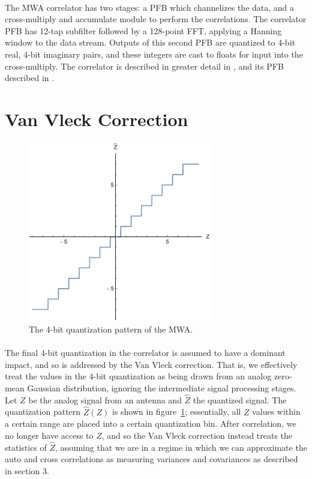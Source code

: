 \documentclass[11pt]{article}
\begin{document}
\paragraph{}
The MWA correlator has two stages: a PFB which channelizes the data, and a cross-multiply and accumulate module to perform the correlations. The correlator PFB  has 12-tap subfilter followed by a 128-point FFT, applying a Hanning window to the data stream. Outputs of this second PFB are quantized to 4-bit real, 4-bit imaginary pairs, and these integers are cast to floats for input into the cross-multiply. The correlator is described in greater detail in \cite{corr}, and its PFB described in \cite{pfb}.
\section{Van Vleck Correction}
\begin{figure}
\centering{}
\includegraphics[width=80mm]{quant.pdf}
\caption{The 4-bit quantization pattern of the MWA.\label{quant}}
\end{figure}
\paragraph{}
The final 4-bit quantization in the correlator is assumed to have a dominant impact, and so is addressed by the Van Vleck correction.
That is, we effectively treat the values in the 4-bit quantization as being drawn from an analog zero-mean Gaussian distribution, ignoring the intermediate signal processing stages. Let $Z$ be the analog signal from an antenna and $\hat Z$ the quantized signal. The quantization pattern $\hat Z(Z)$ is shown in figure~\ref{quant}; essentially, all $Z$ values within a certain range are placed into a certain quantization bin. After correlation, we no longer have access to $\hat Z$, and so the Van Vleck correction instead treats the statistics of $\hat Z$, assuming that we are in a regime in which we can approximate the auto and cross correlations as measuring variances and covariances as described in section 3. 
\end{document}
